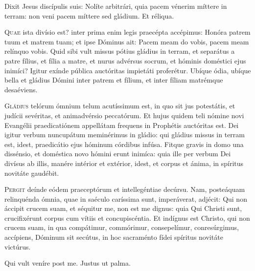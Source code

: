 \horaNocturnusIII



\inIlloTempore{}
Dixit Jesus discípulis suis:
Nolíte arbitrári, quia pacem vénerim míttere in terram:
non veni pacem míttere sed gládium.
Et réliqua.


\lettrine{Q}{uae} ista divísio est?
inter prima enim legis praecépta accépimus:
Honóra patrem tuum et matrem tuam;
et ipse Dóminus ait:
Pacem meam do vobis, pacem meam relínquo vobis.
Quid sibi vult missus pótius gládius in terram,
et separátus a patre fílius, et fília a matre,
et nurus advérsus socrum, et hóminis doméstici ejus inimíci?
Igitur exínde pública auctóritas impietáti proferétur.
Ubíque ódia, ubíque bella et gládius Dómini inter patrem et fílium,
et inter fíliam matrémque desaéviens.



\lettrine{G}{ládius} telórum ómnium telum acutíssimum est,
in quo sit jus potestátis, et judícii sevéritas,
et animadvérsio peccatórum.
Et hujus quidem teli nómine novi Evangélii praedicatiónem
appellátam frequens in Prophétis auctóritas est.
Dei igitur verbum nuncupátum meminérimus in gládio:
qui gládius missus in terram est, idest,
praedicátio ejus hóminum córdibus infúsa.
Fitque gravis in domo una dissénsio,
et doméstica novo hómini erunt inimíca:
quia ille per verbum Dei divísus ab illis,
manére intérior et extérior, idest,
et corpus et ánima, in spíritus novitáte gaudébit.


\lettrine{P}{ergit} deínde eódem praeceptórum et intellegéntiae
decúrsu. Nam, posteáquam relinquénda ómnia,
quae in saéculo caríssima sunt, imperáverat, adjécit:
Qui non áccipit crucem suam, et séquitur me, non est me dignus:
quia Qui Christi sunt, crucifixérunt corpus cum vítiis
et concupiscéntia.
Et indígnus est Christo, qui non crucem suam, in qua compátimur,
commórimur, consepelímur, conresúrgimus, accípiens,
Dóminum sit secútus, in hoc sacraménto fídei spíritus novitáte
victúrus.

\parsTeDeum

Qui vult veníre post me.
Justus ut palma.
